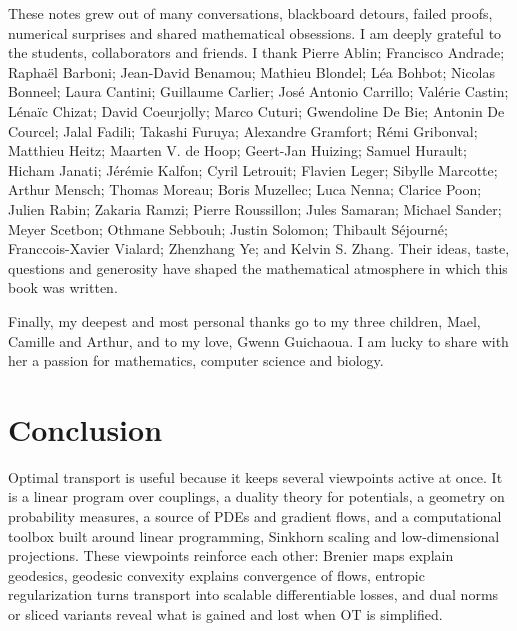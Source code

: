 \documentclass[10pt,a4paper,twoside,openany]{book}
\renewcommand{\c}{c}
\begin{document}
These notes grew out of many conversations, blackboard detours, failed proofs, numerical surprises and shared mathematical obsessions. I am deeply grateful to the students, collaborators and friends. I thank
Pierre Ablin;
Francisco Andrade;
Rapha\"el Barboni;
Jean-David Benamou;
Mathieu Blondel;
L\'ea Bohbot;
Nicolas Bonneel;
Laura Cantini;
Guillaume Carlier;
Jos\'e Antonio Carrillo;
Val\'erie Castin;
L\'ena\"ic Chizat;
David Coeurjolly;
Marco Cuturi;
Gwendoline De Bie;
Antonin De Courcel;
Jalal Fadili;
Takashi Furuya;
Alexandre Gramfort;
R\'emi Gribonval;
Matthieu Heitz;
Maarten V. de Hoop;
Geert-Jan Huizing;
Samuel Hurault;
Hicham Janati;
J\'er\'emie Kalfon;
Cyril Letrouit;
Flavien Leger;
Sibylle Marcotte;
Arthur Mensch;
Thomas Moreau;
Boris Muzellec;
Luca Nenna;
Clarice Poon;
Julien Rabin;
Zakaria Ramzi;
Pierre Roussillon;
Jules Samaran;
Michael Sander;
Meyer Scetbon;
Othmane Sebbouh;
Justin Solomon;
Thibault S\'ejourn\'e;
Fran\c{c}ois-Xavier Vialard;
Zhenzhang Ye;
and Kelvin S. Zhang.
Their ideas, taste, questions and generosity have shaped the mathematical atmosphere in which this book was written.

Finally, my deepest and most personal thanks go to my three children, Mael, Camille and Arthur, and to my love, Gwenn Guichaoua. I am lucky to share with her a passion for mathematics, computer science and biology.

\tableofcontents

\mainmatter


















\chapter*{Conclusion}

Optimal transport is useful because it keeps several viewpoints active at once. It is a linear program over couplings, a duality theory for potentials, a geometry on probability measures, a source of PDEs and gradient flows, and a computational toolbox built around linear programming, Sinkhorn scaling and low-dimensional projections. These viewpoints reinforce each other: Brenier maps explain geodesics, geodesic convexity explains convergence of flows, entropic regularization turns transport into scalable differentiable losses, and dual norms or sliced variants reveal what is gained and lost when OT is simplified.
\end{document}

